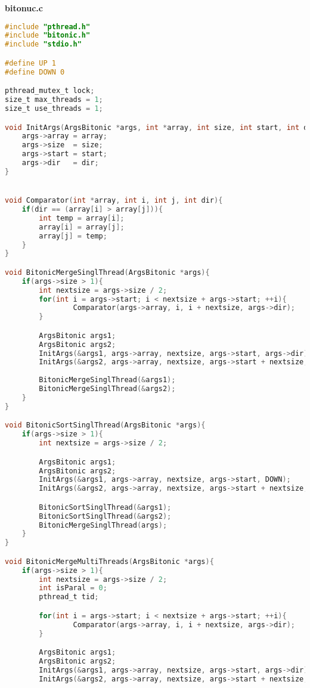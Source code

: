 \documentclass[pdf, unicode, 12pt, a4paper,oneside,fleqn]{article}
\begin{document}
{\large\textbf{bitonuc.c}}

\begin{lstlisting}[language=C]
#include "pthread.h"
#include "bitonic.h"
#include "stdio.h"

#define UP 1
#define DOWN 0

pthread_mutex_t lock;
size_t max_threads = 1;
size_t use_threads = 1;

void InitArgs(ArgsBitonic *args, int *array, int size, int start, int dir){
    args->array = array;
    args->size  = size;
    args->start = start;
    args->dir   = dir;
}


void Comparator(int *array, int i, int j, int dir){
    if(dir == (array[i] > array[j])){
        int temp = array[i];
        array[i] = array[j];
        array[j] = temp;
    }
}

void BitonicMergeSinglThread(ArgsBitonic *args){
    if(args->size > 1){
        int nextsize = args->size / 2;
        for(int i = args->start; i < nextsize + args->start; ++i){
                Comparator(args->array, i, i + nextsize, args->dir);
        }

        ArgsBitonic args1;
        ArgsBitonic args2;
        InitArgs(&args1, args->array, nextsize, args->start, args->dir);
        InitArgs(&args2, args->array, nextsize, args->start + nextsize, args->dir);
        
        BitonicMergeSinglThread(&args1);
        BitonicMergeSinglThread(&args2);
    }
}

void BitonicSortSinglThread(ArgsBitonic *args){
    if(args->size > 1){
        int nextsize = args->size / 2;

        ArgsBitonic args1;
        ArgsBitonic args2;
        InitArgs(&args1, args->array, nextsize, args->start, DOWN);
        InitArgs(&args2, args->array, nextsize, args->start + nextsize, UP);

        BitonicSortSinglThread(&args1);
        BitonicSortSinglThread(&args2);
        BitonicMergeSinglThread(args);
    }
}

void BitonicMergeMultiThreads(ArgsBitonic *args){
    if(args->size > 1){        
        int nextsize = args->size / 2;
        int isParal = 0;
        pthread_t tid;

        for(int i = args->start; i < nextsize + args->start; ++i){
                Comparator(args->array, i, i + nextsize, args->dir);
        }

        ArgsBitonic args1;
        ArgsBitonic args2;
        InitArgs(&args1, args->array, nextsize, args->start, args->dir);
        InitArgs(&args2, args->array, nextsize, args->start + nextsize, args->dir);


\end{lstlisting}
\end{document}
